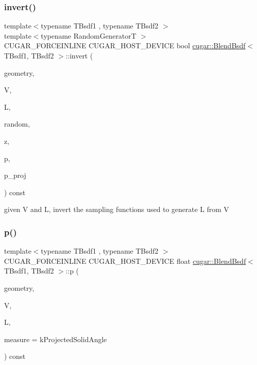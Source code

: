 \subsubsection{\texorpdfstring{invert()}{invert()}}
{\footnotesize\ttfamily template$<$typename T\+Bsdf1 , typename T\+Bsdf2 $>$ \\
template$<$typename Random\+GeneratorT $>$ \\
C\+U\+G\+A\+R\+\_\+\+F\+O\+R\+C\+E\+I\+N\+L\+I\+NE C\+U\+G\+A\+R\+\_\+\+H\+O\+S\+T\+\_\+\+D\+E\+V\+I\+CE bool \hyperlink{structcugar_1_1_blend_bsdf}{cugar\+::\+Blend\+Bsdf}$<$ T\+Bsdf1, T\+Bsdf2 $>$\+::invert (\begin{DoxyParamCaption}\item[{const \hyperlink{structcugar_1_1_differential_geometry}{Differential\+Geometry} \&}]{geometry,  }\item[{const \hyperlink{structcugar_1_1_vector}{Vector3f}}]{V,  }\item[{const \hyperlink{structcugar_1_1_vector}{Vector3f}}]{L,  }\item[{Random\+GeneratorT \&}]{random,  }\item[{\hyperlink{structcugar_1_1_vector}{Vector3f} \&}]{z,  }\item[{float \&}]{p,  }\item[{float \&}]{p\+\_\+proj }\end{DoxyParamCaption}) const\hspace{0.3cm}{\ttfamily [inline]}}

given V and L, invert the sampling functions used to generate L from V \mbox{\label{structcugar_1_1_blend_bsdf_a682a0bffe043ff21a03d519921bef7bc}} 
\subsubsection{\texorpdfstring{p()}{p()}}
{\footnotesize\ttfamily template$<$typename T\+Bsdf1 , typename T\+Bsdf2 $>$ \\
C\+U\+G\+A\+R\+\_\+\+F\+O\+R\+C\+E\+I\+N\+L\+I\+NE C\+U\+G\+A\+R\+\_\+\+H\+O\+S\+T\+\_\+\+D\+E\+V\+I\+CE float \hyperlink{structcugar_1_1_blend_bsdf}{cugar\+::\+Blend\+Bsdf}$<$ T\+Bsdf1, T\+Bsdf2 $>$\+::p (\begin{DoxyParamCaption}\item[{const \hyperlink{structcugar_1_1_differential_geometry}{Differential\+Geometry} \&}]{geometry,  }\item[{const \hyperlink{structcugar_1_1_vector}{Vector3f}}]{V,  }\item[{const \hyperlink{structcugar_1_1_vector}{Vector3f}}]{L,  }\item[{const Spherical\+Measure}]{measure = {\ttfamily kProjectedSolidAngle} }\end{DoxyParamCaption}) const\hspace{0.3cm}{\ttfamily [inline]}}

